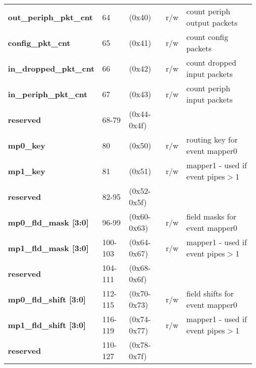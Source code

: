 \documentclass[11pt,a4paper,twoside]{article}
\begin{document}
\begin{center}
\begin{table}[!h]
\begin{tabularx}{\textwidth}{| p{36mm} p{13mm} p{21mm} p{7mm} X |}
		\textbf{out\_periph\_pkt\_cnt}       & 64                         & (0x40)                         & r/w                 & count periph output packets\\%
		\textbf{config\_pkt\_cnt}            & 65                         & (0x41)                         & r/w                 & count config packets \\%
		\textbf{in\_dropped\_pkt\_cnt}       & 66                         & (0x42)                         & r/w                 & count dropped input packets \\%
		\textbf{in\_periph\_pkt\_cnt}        & 67                         & (0x43)                         & r/w                 & count periph input packets\\%
		\cellcolor{gray!25}\textbf{reserved} & \cellcolor{gray!25}68-79   & \cellcolor{gray!25}(0x44-0x4f) & \cellcolor{gray!25} & \cellcolor{gray!25}\\%
		\textbf{mp0\_key}                    & 80                         & (0x50)                         & r/w                 & routing key for event mapper0 \\%
		\textbf{mp1\_key}                    & 81                         & (0x51)                         & r/w                 & mapper1 - used if event pipes$>$1 \\%
		\cellcolor{gray!25}\textbf{reserved} & \cellcolor{gray!25}82-95   & \cellcolor{gray!25}(0x52-0x5f) & \cellcolor{gray!25} & \cellcolor{gray!25}\\%
		\textbf{mp0\_fld\_mask [3:0]}        & 96-99                      & (0x60-0x63)                    & r/w                 & field masks for event mapper0 \\%
		\textbf{mp1\_fld\_mask [3:0]}        & 100-103                    & (0x64-0x67)                    & r/w                 & mapper1 - used if event pipes$>$1 \\%
		\cellcolor{gray!25}\textbf{reserved} & \cellcolor{gray!25}104-111 & \cellcolor{gray!25}(0x68-0x6f) & \cellcolor{gray!25} & \cellcolor{gray!25}\\%
		\textbf{mp0\_fld\_shift [3:0]}       & 112-115                    & (0x70-0x73)                    & r/w                 & field shifts for event mapper0  \\%
		\textbf{mp1\_fld\_shift [3:0]}       & 116-119                    & (0x74-0x77)                    & r/w                 & mapper1 - used if event pipes$>$1  \\%
		\cellcolor{gray!25}\textbf{reserved} & \cellcolor{gray!25}110-127 & \cellcolor{gray!25}(0x78-0x7f) & \cellcolor{gray!25} & \cellcolor{gray!25}\\%

\end{tabularx}
\end{table}
\end{center}
\end{document}
